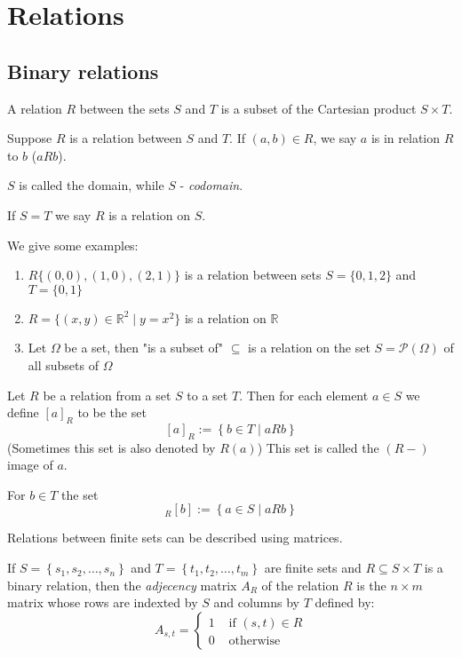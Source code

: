\section{Relations}
\subsection{Binary relations}
\begin{definition}[Ralation]
    A relation $R$ between the sets $S$ and $T$ is a subset of the Cartesian product $S \times T$.  \par
    Suppose $R$ is a relation between $S$ and $T$. If $(a,b) \in R$, we say $a$ is in relation $R$ to $b$ ($aRb$).  \par
    $S$ is called the domain, while $S$ - \emph{codomain}. \par
    If $S=T$ we say $R$ is a relation on $S$.
\end{definition}
\begin{example}
    We give some examples:
    \begin{enumerate}
        \item $ R \{(0,0), (1,0), (2,1)\} $ is a relation between sets $ S = \{0,1,2\} $ and $ T = \{0,1\} $
        \item $ R = \{(x,y) \in \mathbb{R}^2 \mid y = x^2 \} $ is a relation on $ \mathbb{R} $
        \item Let $ \Omega $ be a set, then "is a subset of" $ \subseteq $ is a relation on the set $S = \mathcal{P}(\Omega)$ of all subsets of $ \Omega $
    \end{enumerate}
\end{example}

\begin{definition}[Image]
    Let $R$ be a relation from a set $S$ to a set $T$. Then for each element $a \in S$ we define $ \left[a\right]_R $ to be the set
    $$ \left[a\right]_R := \left\{b \in T \mid aRb\right\}$$
    (Sometimes this set is also denoted by $ R(a) $) This set is called the $(R-)$ image of $a$. \par
    For $b \in T$ the set
    $$ _R\left[b\right] := \left\{a \in S \mid aRb\right\} $$
\end{definition}

Relations between finite sets can be described using matrices.
\begin{definition}
    If $ S = \left\{s_1, s_2, \dots, s_n\right\} $ and $ T = \left\{t_1, t_2, \dots, t_m\right\} $ are finite sets
    and $ R \subseteq S \times T $ is a binary relation, then the \emph{adjecency} matrix $ A_R $ of the relation $ R $ is the $ n \times m $ matrix
    whose rows are indexted by $S$ and columns by $T$ defined by:
    $$ A_{s,t} = \begin{cases}
        1 &\text{ if } (s,t) \in R \\
        0 &\text{ otherwise }
    \end{cases} $$
\end{definition}

